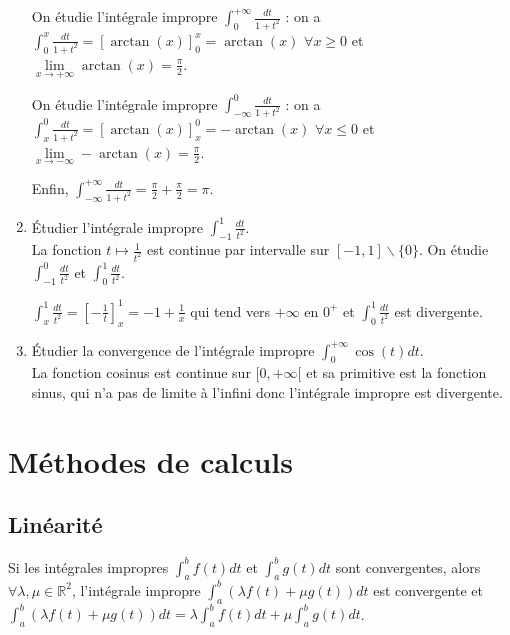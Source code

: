 \documentclass[a4paper,10pt]{book} %
\newcommand{\R}{\mathbb{R}}
\newcommand{\displayAmath}{\displaystyle}
\begin{document}
\begin{enumerate}
\smallskip
On étudie l'intégrale impropre $\displayAmath\int_0^{+\infty}\frac{dt}{1+t^2}$ : on a $\displayAmath\int_0^x\frac{dt}{1+t^2}=[\arctan(x)]_0^x=\arctan(x)$ $\forall x\geq 0$ et $\lim\limits_{x\rightarrow +\infty}\arctan(x)=\frac{\pi}{2}$.

\smallskip
On étudie l'intégrale impropre $\displayAmath\int_{-\infty}^0\frac{dt}{1+t^2}$ : on a $\displayAmath\int_x^0\frac{dt}{1+t^2}=[\arctan(x)]_x^0=-\arctan(x)$ $\forall x\leq 0$ et $\lim\limits_{x\rightarrow -\infty}-\arctan(x)=\frac{\pi}{2}$.

\smallskip
Enfin, $\displayAmath\int_{-\infty}^{+\infty}\frac{dt}{1+t^2}=\frac{\pi}{2}+\frac{\pi}{2}=\pi$.

\smallskip

\item Étudier l'intégrale impropre $\displayAmath\int_{-1}^{1}\frac{dt}{t^2}$.\\
La fonction $t\mapsto \frac{1}{t^2}$ est continue par intervalle sur $[-1,1]\backslash\{0\}$. On étudie $\displayAmath\int_{-1}^{0}\frac{dt}{t^2}$ et $\displayAmath\int_0^1\frac{dt}{t^2}$.

$\displayAmath\int_{x}^{1}\frac{dt}{t^2}=[-\frac{1}{t}]_x^1=-1+\frac{1}{x}$ qui tend vers $+\infty$ en $0^+$ et  $\displayAmath\int_0^1\frac{dt}{t^2}$ est divergente.

\item Étudier la convergence de l'intégrale impropre $\displayAmath\int_{0}^{+\infty}\cos(t)dt$.\\
La fonction cosinus est continue sur $[0,+\infty[$ et sa primitive est la fonction sinus, qui n'a pas de limite à l'infini donc l'intégrale impropre est divergente.

\end{enumerate}

\newpage

\section{Méthodes de calculs}
\subsection{Linéarité}
Si les intégrales impropres $\displayAmath\int_a^b f(t)dt$ et $\displayAmath\int_a^bg(t)dt$ sont convergentes, alors $\forall \lambda,\mu\in \R^2$, l'intégrale impropre $\displayAmath\int_a^b(\lambda f(t)+\mu g(t))dt$ est convergente et $\displayAmath\int_a^b(\lambda f(t)+\mu g(t))dt=\lambda\int_a^bf(t)dt+\mu\int_a^bg(t)dt$.
\end{document}
